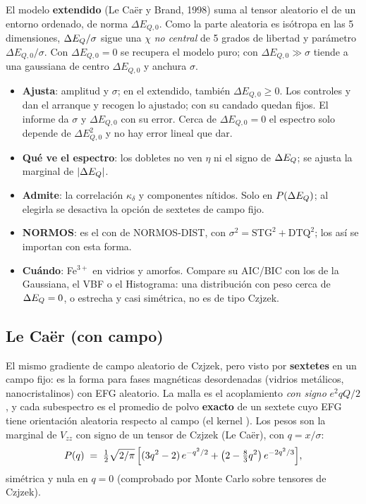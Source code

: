 El modelo \textbf{extendido} (Le Caër y Brand, 1998) suma al tensor aleatorio el
de un entorno ordenado, de norma $\Delta E_{Q,0}$. Como la parte aleatoria es isótropa
en las 5 dimensiones, $\Delta E_{Q}/\sigma$ sigue una $\chi$ \emph{no central} de 5
grados de libertad y parámetro $\Delta E_{Q,0}/\sigma$. Con $\Delta E_{Q,0}=0$ se recupera el
modelo puro; con $\Delta E_{Q,0}\gg\sigma$ tiende a una gaussiana de centro $\Delta E_{Q,0}$ y
anchura $\sigma$.

\begin{itemize}[nosep]
  \item \textbf{Ajusta}: amplitud y $\sigma$; en el extendido, también
        $\Delta E_{Q,0}\ge 0$. Los controles  y
         dan el arranque y recogen lo ajustado; con su
        candado quedan fijos. El informe da $\sigma$ y $\Delta E_{Q,0}$ con su error. Cerca de
        $\Delta E_{Q,0}=0$ el espectro solo depende de $\Delta E_{Q,0}^2$ y no hay error lineal
        que dar.
  \item \textbf{Qué ve el espectro}: los dobletes no ven $\eta$ ni el signo de
        $\Delta E_{Q}$; se ajusta la marginal de $|\Delta E_{Q}|$.
  \item \textbf{Admite}: la correlación $\kappa_\delta$ y componentes nítidos.
        Solo en $P(\Delta E_{Q})$; al elegirla se desactiva la opción de sextetes
        de campo fijo.
  \item \textbf{NORMOS}: es el  con  de
        NORMOS-DIST, con $\sigma^2=\mathrm{STG}^2+\mathrm{DTQ}^2$; los
         así se importan con esta forma.
  \item \textbf{Cuándo}: Fe$^{3+}$ en vidrios y amorfos. Compare su AIC/BIC con
        los de la Gaussiana, el VBF o el Histograma: una distribución con peso
        cerca de $\Delta E_{Q}=0$, o estrecha y casi simétrica, no es de tipo Czjzek.
\end{itemize}

\subsection{Le Caër (con campo)}
\label{sec:forma-lecaer}

El mismo gradiente de campo aleatorio de Czjzek, pero visto por
\textbf{sextetes} en un campo fijo: es la forma para fases magnéticas
desordenadas (vidrios metálicos, nanocristalinos) con EFG aleatorio. La malla
es el acoplamiento \emph{con signo} $e^2qQ/2$, y cada subespectro es el
promedio de polvo \textbf{exacto} de un sextete cuyo EFG tiene orientación
aleatoria respecto al campo (el kernel ). Los pesos
son la marginal de $V_{zz}$ con signo de un tensor de Czjzek (Le Caër), con
$q = x/\sigma$:
\[
  P(q) \;=\; \tfrac12\sqrt{2/\pi}\,\Bigl[(3q^{2}-2)\,e^{-q^{2}/2}
        + \bigl(2-\tfrac83 q^{2}\bigr)\,e^{-2q^{2}/3}\Bigr],
\]
simétrica y nula en $q=0$ (comprobado por Monte Carlo sobre tensores de Czjzek).

